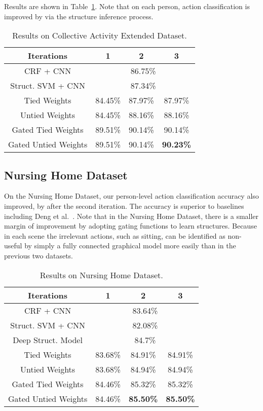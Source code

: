 \documentclass[10pt,twocolumn,letterpaper]{article}
\begin{document}
Results are shown in  Table~\ref{sec:exp:cad_ext}. Note that on each person, action classification is improved by  via the structure inference process.
\begin{table}
\begin{tabular}{|c|c|c|c|}
\hline
Iterations & 1 & 2 & 3\\
\hline
\hline
CRF + CNN& \multicolumn{3}{|c|}{86.75\%} \\
\hline
Struct. SVM + CNN & \multicolumn{3}{|c|}{87.34\%} \\
\hline
Tied Weights & 84.45\% & 87.97\% & 87.97\% \\
\hline
Untied Weights & 84.45\% &  88.16\% & 88.16\% \\
\hline
Gated Tied Weights & 89.51\% &  90.14\%  & 90.14\% \\
\hline
Gated Untied Weights & 89.51\% &  90.14\% & \bf 90.23\% \\
\hline
\end{tabular}
\caption{Results on Collective Activity Extended Dataset.}
\label{sec:exp:cad_ext}
\vspace{-4mm}
\end{table}
\vspace{-0.5mm}

\subsection{Nursing Home Dataset}
On the Nursing Home Dataset, our person-level action classification accuracy also improved, by  after the second iteration. 
The accuracy is superior to baselines including Deng et al.~\cite{DengZCLMRM15}.
Note that in the Nursing Home Dataset, there is a smaller margin of improvement by adopting gating functions to learn structures. Because in each scene the irrelevant actions, such as sitting, can be identified as non-useful by simply a fully connected graphical model more easily than in the previous two datasets.

\begin{table}
\begin{tabular}{|c|c|c|c|}
\hline
Iterations & 1 & 2 & 3 \\
\hline
\hline
CRF + CNN & \multicolumn{3}{|c|}{83.64\%} \\
\hline
Struct. SVM + CNN & \multicolumn{3}{|c|}{82.08\%} \\
\hline
Deep Struct. Model \cite{DengZCLMRM15} & \multicolumn{3}{|c|}{84.7\%} \\
\hline
Tied Weights & 83.68\% & 84.91\% & 84.91\% \\
\hline
Untied Weights & 83.68\% &  84.94\% & 84.94\% \\
\hline
Gated Tied Weights & 84.46\% &  85.32\%  & 85.32\% \\
\hline
Gated Untied Weights & 84.46\% & \bf 85.50\% & \bf 85.50\% \\
\hline
\end{tabular}
\caption{Results on Nursing Home Dataset.}
\label{sec:exp:nursing}
\vspace{-5mm}
\end{table}
\end{document}
